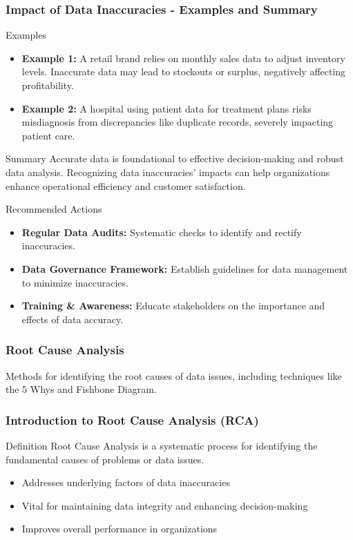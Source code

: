 \documentclass{beamer}
\begin{document}
\begin{frame}[fragile]
    \frametitle{Impact of Data Inaccuracies - Examples and Summary}
    \begin{block}{Examples}
        \begin{itemize}
            \item \textbf{Example 1:} A retail brand relies on monthly sales data to adjust inventory levels. Inaccurate data may lead to stockouts or surplus, negatively affecting profitability.
            \item \textbf{Example 2:} A hospital using patient data for treatment plans risks misdiagnosis from discrepancies like duplicate records, severely impacting patient care.
        \end{itemize}
    \end{block}

    \begin{block}{Summary}
        Accurate data is foundational to effective decision-making and robust data analysis. Recognizing data inaccuracies' impacts can help organizations enhance operational efficiency and customer satisfaction.
    \end{block}

    \begin{block}{Recommended Actions}
        \begin{itemize}
            \item \textbf{Regular Data Audits:} Systematic checks to identify and rectify inaccuracies.
            \item \textbf{Data Governance Framework:} Establish guidelines for data management to minimize inaccuracies.
            \item \textbf{Training \& Awareness:} Educate stakeholders on the importance and effects of data accuracy.
        \end{itemize}
    \end{block}
\end{frame}

\begin{frame}[fragile]
    \frametitle{Root Cause Analysis}
    Methods for identifying the root causes of data issues, including techniques like the 5 Whys and Fishbone Diagram.
\end{frame}

\begin{frame}[fragile]
    \frametitle{Introduction to Root Cause Analysis (RCA)}
    \begin{block}{Definition}
        Root Cause Analysis is a systematic process for identifying the fundamental causes of problems or data issues. 
    \end{block}
    \begin{itemize}
        \item Addresses underlying factors of data inaccuracies
        \item Vital for maintaining data integrity and enhancing decision-making
        \item Improves overall performance in organizations
    \end{itemize}
\end{frame}
\end{document}

